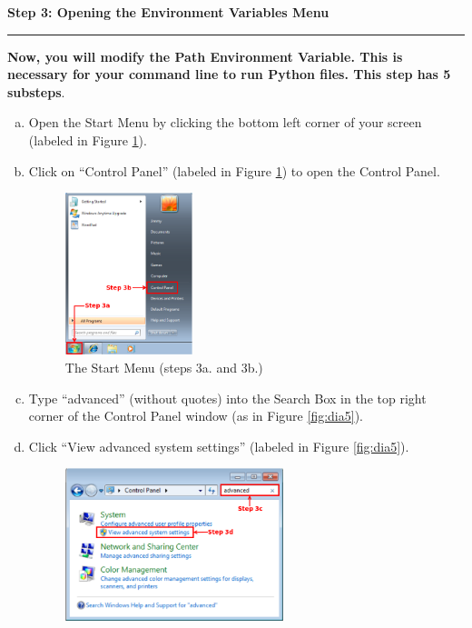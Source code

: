 \documentclass[11pt,english]{article}
\newcommand{\myhrule}{\vspace{0.3cm}\hrule\vspace{0.3cm}}
\begin{document}
\newpage
{\Large {\bf Step 3: Opening the Environment Variables Menu}}
\myhrule
{\bf Now, you will modify the Path Environment Variable. This is necessary for
your command line to run Python files. This step has 5 substeps}.
\begin{enumerate}[a.]
\item Open the Start Menu by clicking the bottom left corner of your screen
(labeled in Figure \ref{fig:dia4}).
\item Click on ``Control Panel'' (labeled in Figure \ref{fig:dia4}) to open
the Control Panel.
\begin{figure}[h]
\begin{center}
\includegraphics[width=0.35\textwidth]{dia4}
\end{center}
\vspace{-0.5cm}
\caption{The Start Menu (steps 3a. and 3b.)}
\label{fig:dia4}
\end{figure}
\item Type ``advanced'' (without quotes) into the Search Box in the top right
corner of the Control Panel window (as in Figure \ref{fig:dia5}).
\item Click ``View advanced system settings'' (labeled in Figure
\ref{fig:dia5}).
\begin{figure}[h]
\begin{center}
\includegraphics[width=0.6\textwidth]{dia5}
\end{center}

\end{figure}
\end{enumerate}
\end{document}
